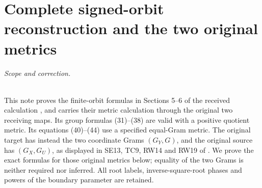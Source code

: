 \endgroup

\clearpage\begingroup
\part*{Complete signed-orbit reconstruction and the two original metrics}
\newcommand{\sforbitC}{\mathbb C}
\newcommand{\sforbittr}{\operatorname{tr}}
\newcommand{\sforbitdiag}{\operatorname{diag}}
\newcommand{\sforbitsgn}{\operatorname{sgn}}
\newcommand{\sforbitrank}{\operatorname{rank}}
\newcommand{\sforbitim}{\operatorname{im}}
\newcommand{\sforbiteps}{\varepsilon}
\newcommand{\sforbitone}{\mathbf 1}



\paragraph{Scope and correction.}
This note proves the finite-orbit formulas in Sections 5--6 of the
received calculation \cite{sforbit:Incoming}, and carries their metric calculation
through the original two receiving maps.  Its group formulas (31)--(38)
are valid with a positive quotient metric.  Its equations (40)--(44)
use a specified equal-Gram metric.  The original target has instead
the two coordinate Grams $(G_Y,G)$, and the original source has
$(G_X,G_U)$, as displayed in SE13, TC9, RW14 and RW19 of \cite{sforbit:Fable}.
We prove the exact formulas for those original metrics below; equality
of the two Grams is neither required nor inferred.
All root labels, inverse-square-root phases and powers of the boundary
parameter are retained.

